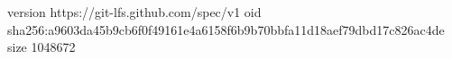 version https://git-lfs.github.com/spec/v1
oid sha256:a9603da45b9cb6f0f49161e4a6158f6b9b70bbfa11d18aef79dbd17c826ac4de
size 1048672
